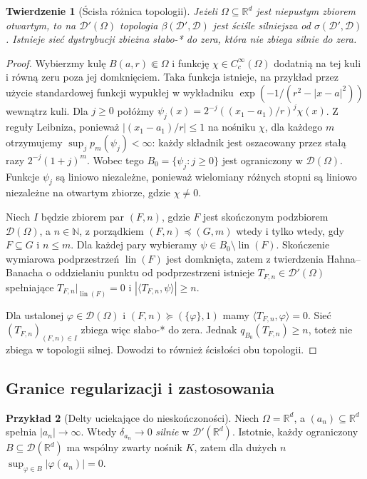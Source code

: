 \documentclass[11pt,a4paper]{article}
\numberwithin{equation}{section}
\theoremstyle{plain}
\newtheorem{twierdzenie}{Twierdzenie}[section]
\theoremstyle{definition}
\newtheorem{przyklad}[twierdzenie]{Przykład}
\theoremstyle{remark}
\newcommand{\R}{\mathbb R}
\newcommand{\N}{\mathbb N}
\begin{document}
\begin{twierdzenie}[Ścisła różnica topologii]
\label{thm:weak-strong-different19}
Jeżeli $\Omega\subseteq\R^d$ jest niepustym zbiorem
otwartym, to na $\mathcal D'(\Omega)$ topologia
$\beta(\mathcal D',\mathcal D)$ jest ściśle silniejsza
od $\sigma(\mathcal D',\mathcal D)$. Istnieje sieć
dystrybucji zbieżna słabo-* do zera, która nie
zbiega silnie do zera.
\end{twierdzenie}
\begin{proof}
Wybierzmy kulę $B(a,r)\Subset\Omega$ i funkcję
$\chi\in C_c^\infty(\Omega)$ dodatnią na tej kuli
i równą zeru poza jej domknięciem. Taka funkcja istnieje,
na przykład przez użycie standardowej funkcji wypukłej
w wykładniku $\exp(-1/(r^2-|x-a|^2))$ wewnątrz kuli.
Dla $j\ge0$ połóżmy
$\psi_j(x)=2^{-j}((x_1-a_1)/r)^j\chi(x)$.
Z reguły Leibniza, ponieważ $|(x_1-a_1)/r|\le1$
na nośniku $\chi$, dla każdego $m$ otrzymujemy
$\sup_jp_m(\psi_j)<\infty$: każdy składnik jest
oszacowany przez stałą razy $2^{-j}(1+j)^m$.
Wobec tego $B_0=\{\psi_j:j\ge0\}$ jest ograniczony
w $\mathcal D(\Omega)$. Funkcje $\psi_j$ są
liniowo niezależne, ponieważ wielomiany różnych stopni
są liniowo niezależne na otwartym zbiorze, gdzie
$\chi\ne0$.

Niech $I$ będzie zbiorem par $(F,n)$, gdzie $F$ jest
skończonym podzbiorem $\mathcal D(\Omega)$, a $n\in\N$,
z porządkiem $(F,n)\preceq(G,m)$ wtedy i tylko wtedy,
gdy $F\subseteq G$ i $n\le m$. Dla każdej pary wybieramy
$\psi\in B_0\setminus\operatorname{lin}(F)$.
Skończenie wymiarowa podprzestrzeń
$\operatorname{lin}(F)$ jest domknięta, zatem
z twierdzenia Hahna--Banacha o oddzielaniu punktu od
podprzestrzeni istnieje $T_{F,n}\in\mathcal D'(\Omega)$
spełniające $T_{F,n}|_{\operatorname{lin}(F)}=0$ i
$|\langle T_{F,n},\psi\rangle|\ge n$.

Dla ustalonej $\varphi\in\mathcal D(\Omega)$ i
$(F,n)\succeq(\{\varphi\},1)$ mamy
$\langle T_{F,n},\varphi\rangle=0$. Sieć
$(T_{F,n})_{(F,n)\in I}$ zbiega więc słabo-* do zera.
Jednak $q_{B_0}(T_{F,n})\ge n$, toteż nie zbiega
w topologii silnej. Dowodzi to również ścisłości
obu topologii.
\end{proof}

\subsection{Granice regularizacji i zastosowania}

\begin{przyklad}[Delty uciekające do nieskończoności]
\label{ex:delta-escape19}
Niech $\Omega=\R^d$, a $(a_n)\subseteq\R^d$
spełnia $|a_n|\to\infty$. Wtedy $\delta_{a_n}\to0$
\emph{silnie} w $\mathcal D'(\R^d)$.
Istotnie, każdy ograniczony $B\subseteq\mathcal D(\R^d)$
ma wspólny zwarty nośnik $K$, zatem dla dużych $n$
$\sup_{\varphi\in B}|\varphi(a_n)|=0$.
\end{przyklad}
\end{document}
